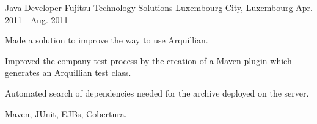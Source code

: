 \begin{cventries}
  \cventry
    {Java Developer} %
    {Fujitsu Technology Solutions} %
    {Luxembourg City, Luxembourg} %
    {Apr. 2011 - Aug. 2011} %
    {
      \begin{cvitems} %
        	\item Made a solution to improve the way to use Arquillian.
		\item Improved the company test process by the creation of a Maven plugin which generates an Arquillian test class.
		\item Automated search of dependencies needed for the archive deployed on the server.
      \end{cvitems}
    }
    {Maven, JUnit, EJBs, Cobertura.}

\end{cventries}
